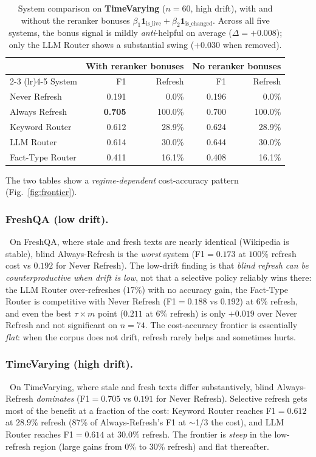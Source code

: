 \documentclass[pdflatex,sn-basic]{sn-jnl}
\providecommand{\mathbbm}[1]{\mathbf{#1}}
\begin{document}
\begin{table}[htbp]
\caption{System comparison on \textbf{TimeVarying} ($n{=}60$, high drift), with and without the reranker bonuses $\beta_1\mathbbm{1}_{\text{is\_live}}+\beta_2\mathbbm{1}_{\text{is\_changed}}$. Across all five systems, the bonus signal is mildly \emph{anti}-helpful on average ($\Delta = +0.008$); only the LLM Router shows a substantial swing ($+0.030$ when removed).}
\label{tab:timevarying}
\centering
\begin{tabular}{lrrrr}
\toprule
 & \multicolumn{2}{c}{\textbf{With reranker bonuses}} & \multicolumn{2}{c}{\textbf{No reranker bonuses}} \\
 \cmidrule(lr){2-3} \cmidrule(lr){4-5}
System & F1 & Refresh & F1 & Refresh \\
\midrule
Never Refresh     & 0.191 & 0.0\%  & 0.196 & 0.0\% \\
Always Refresh    & \textbf{0.705} & 100.0\% & 0.700 & 100.0\% \\
Keyword Router    & 0.612 & 28.9\% & 0.624 & 28.9\% \\
LLM Router        & 0.614 & 30.0\% & 0.644 & 30.0\% \\
Fact-Type Router  & 0.411 & 16.1\% & 0.408 & 16.1\% \\
\bottomrule
\end{tabular}
\end{table}

The two tables show a \emph{regime-dependent} cost-accuracy pattern (Fig.~\ref{fig:frontier}).

\subsubsection*{FreshQA (low drift).}~On FreshQA, where stale and fresh texts are nearly identical (Wikipedia is stable), blind Always-Refresh is the \emph{worst} system (F1$=0.173$ at $100\%$ refresh cost vs $0.192$ for Never Refresh). The low-drift finding is that \emph{blind refresh can be counterproductive when drift is low}, not that a selective policy reliably wins there: the LLM Router over-refreshes ($17\%$) with no accuracy gain, the Fact-Type Router is competitive with Never Refresh (F1$=0.188$ vs $0.192$) at $6\%$ refresh, and even the best $\tau{\times}m$ point ($0.211$ at $6\%$ refresh) is only $+0.019$ over Never Refresh and not significant on $n{=}74$. The cost-accuracy frontier is essentially \emph{flat}: when the corpus does not drift, refresh rarely helps and sometimes hurts.

\subsubsection*{TimeVarying (high drift).}~On TimeVarying, where stale and fresh texts differ substantively, blind Always-Refresh \emph{dominates} (F1$=0.705$ vs $0.191$ for Never Refresh). Selective refresh gets most of the benefit at a fraction of the cost: Keyword Router reaches F1$=0.612$ at $28.9\%$ refresh (87\% of Always-Refresh's F1 at $\sim$1/3 the cost), and LLM Router reaches F1$=0.614$ at $30.0\%$ refresh. The frontier is \emph{steep} in the low-refresh region (large gains from 0\% to 30\% refresh) and flat thereafter.
\end{document}
